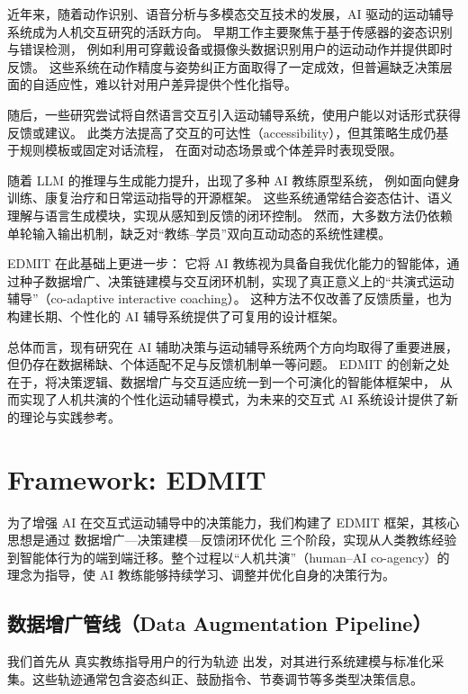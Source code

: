 \documentclass[sigconf]{acmart}
\begin{document}
近年来，随着动作识别、语音分析与多模态交互技术的发展，AI 驱动的运动辅导系统成为人机交互研究的活跃方向。  
早期工作主要聚焦于基于传感器的姿态识别与错误检测\cite{}，  
例如利用可穿戴设备或摄像头数据识别用户的运动动作并提供即时反馈\cite{}。  
这些系统在动作精度与姿势纠正方面取得了一定成效，但普遍缺乏决策层面的自适应性，难以针对用户差异提供个性化指导。

随后，一些研究尝试将自然语言交互引入运动辅导系统，使用户能以对话形式获得反馈或建议\cite{}。  
此类方法提高了交互的可达性（accessibility），但其策略生成仍基于规则模板或固定对话流程，  
在面对动态场景或个体差异时表现受限。

随着 LLM 的推理与生成能力提升，出现了多种 AI 教练原型系统，  
例如面向健身训练、康复治疗和日常运动指导的开源框架\cite{}。  
这些系统通常结合姿态估计、语义理解与语言生成模块，实现从感知到反馈的闭环控制。  
然而，大多数方法仍依赖单轮输入输出机制，缺乏对“教练–学员”双向互动动态的系统性建模。  

\textsc{EDMIT} 在此基础上更进一步：  
它将 AI 教练视为具备自我优化能力的智能体，通过种子数据增广、决策链建模与交互闭环机制，实现了真正意义上的“共演式运动辅导”（co-adaptive interactive coaching）。  
这种方法不仅改善了反馈质量，也为构建长期、个性化的 AI 辅导系统提供了可复用的设计框架。

总体而言，现有研究在 AI 辅助决策与运动辅导系统两个方向均取得了重要进展，  
但仍存在数据稀缺、个体适配不足与反馈机制单一等问题。  
\textsc{EDMIT} 的创新之处在于，将决策逻辑、数据增广与交互适应统一到一个可演化的智能体框架中，  
从而实现了人机共演的个性化运动辅导模式，为未来的交互式 AI 系统设计提供了新的理论与实践参考。

\section{Framework: EDMIT}

为了增强 AI 在交互式运动辅导中的决策能力，我们构建了 EDMIT 框架，其核心思想是通过 数据增广—决策建模—反馈闭环优化 三个阶段，实现从人类教练经验到智能体行为的端到端迁移。整个过程以“人机共演”（human–AI co-agency）的理念为指导，使 AI 教练能够持续学习、调整并优化自身的决策行为。

\subsection{数据增广管线（Data Augmentation Pipeline）}

我们首先从 真实教练指导用户的行为轨迹 出发，对其进行系统建模与标准化采集。这些轨迹通常包含姿态纠正、鼓励指令、节奏调节等多类型决策信息。
\end{document}

